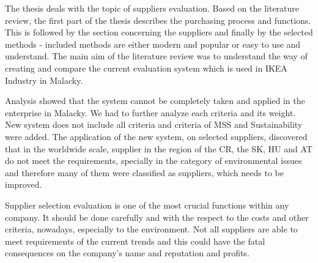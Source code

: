 \documentclass[oneside,12pt]{article}%
\begin{document}



The thesis deals with the topic of suppliers evaluation. Based on the literature review, the first part of the thesis describes the purchasing process and functions. This is followed by the section concerning the suppliers and finally by the selected methods - included methods are either modern and popular or easy to use and understand. The main aim of the literature review was to understand the way of creating and compare the current evaluation system which is used in IKEA Industry in Malacky. \par
Analysis showed that the system cannot be completely taken and applied in the enterprise in Malacky. We had to further analyze each criteria and its weight. New system does not include all criteria and criteria of MSS and Sustainability were added. The application of the new system, on selected suppliers, discovered that in the worldwide scale, supplier in the region of the CR, the SK, HU and AT do not meet the requirements, specially in the category of environmental issues and therefore many of them were classified as suppliers, which needs to be improved. \par
Supplier selection evaluation is one of the most crucial functions within any company. It should be done carefully and with the respect to the costs and other criteria, nowadays, especially to the environment. Not all suppliers are able to meet requirements of the current trends and this could have the fatal consequences on the company's name and reputation and profits.
\end{document}
